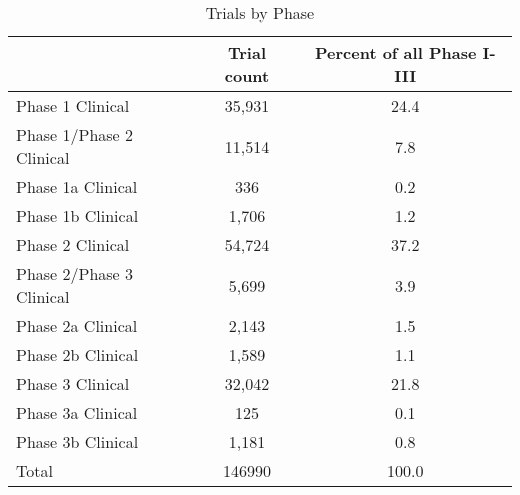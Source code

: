 \begin{table}[htbp]\centering
\def\sym#1{\ifmmode^{#1}\else\(^{#1}\)\fi}
\caption{Trials by Phase}
\begin{tabular}{l*{1}{cc}}
\hline\hline
          &Trial count&Percent of all Phase I-III\\
\hline
Phase 1 Clinical&   35,931&     24.4\\
Phase 1/Phase 2 Clinical&   11,514&      7.8\\
Phase 1a Clinical&      336&      0.2\\
Phase 1b Clinical&    1,706&      1.2\\
Phase 2 Clinical&   54,724&     37.2\\
Phase 2/Phase 3 Clinical&    5,699&      3.9\\
Phase 2a Clinical&    2,143&      1.5\\
Phase 2b Clinical&    1,589&      1.1\\
Phase 3 Clinical&   32,042&     21.8\\
Phase 3a Clinical&      125&      0.1\\
Phase 3b Clinical&    1,181&      0.8\\
Total     &   146990&    100.0\\
\hline\hline
\end{tabular}
\end{table}
